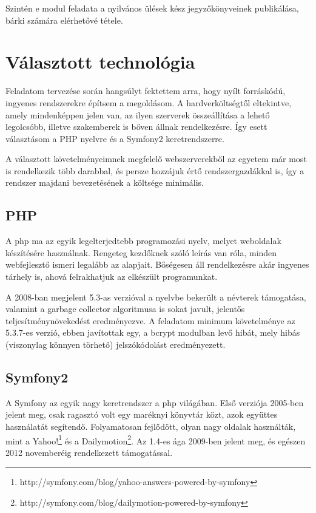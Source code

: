 \documentclass[a4paper,12pt,oneside]{report}
\begin{document}
Szintén e modul feladata a nyilvános ülések kész jegyzőkönyveinek publikálása, bárki számára elérhetővé tétele.

\section{Választott technológia}

Feladatom tervezése során hangsúlyt fektettem arra, hogy nyílt forráskódú, ingyenes rendszerekre építsem a megoldásom. A hardverköltségtől eltekintve, amely mindenképpen jelen van, az ilyen szerverek összeállítása a lehető legolcsóbb, illetve szakemberek is bőven állnak rendelkezésre. Így esett választásom a PHP nyelvre és a Symfony2 keretrendszerre.

A választott követelményeimnek megfelelő webszerverekből az egyetem már most is rendelkezik több darabbal, és persze hozzájuk értő rendszergazdákkal is, így a rendszer majdani bevezetésének a költsége minimális.

\subsection{PHP}

A php ma az egyik legelterjedtebb programozási nyelv, melyet weboldalak készítésére használnak. Rengeteg kezdőknek szóló leírás van róla, minden webfejlesztő ismeri legalább az alapjait. Bőségesen áll rendelkezésre akár ingyenes tárhely is, ahová felrakhatjuk az elkészült programunkat.

A 2008-ban megjelent 5.3-as verzióval a nyelvbe bekerült a névterek támogatása, valamint a garbage collector algoritmusa is sokat javult, jelentős teljesítmény\-növe\-kedést eredményezve. A feladatom minimum követelménye az 5.3.7-es verzió, ebben javítottak egy, a bcrypt modulban levő hibát, mely hibás (viszonylag könnyen törhető) jelszókódolást eredményezett.

\subsection{Symfony2}

A Symfony az egyik nagy keretrendszer a php világában. Első verziója 2005-ben jelent meg, csak ragasztó volt egy maréknyi könyvtár közt, azok együttes használatát segítendő. Folyamatosan fejlődött, olyan nagy oldalak hasz\-nálták, mint a Yahoo!\footnote{http://symfony.com/blog/yahoo-answers-powered-by-symfony} és a Dailymotion\footnote{http://symfony.com/blog/dailymotion-powered-by-symfony}. Az 1.4-es ága 2009-ben jelent meg, és egészen 2012 novemberéig rendelkezett támogatással.
\end{document}
